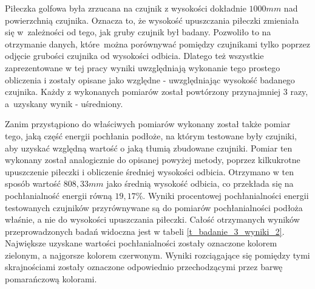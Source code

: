 Piłeczka golfowa była zrzucana na czujnik z wysokości dokładnie $1000 mm$ nad powierzchnią czujnika. Oznacza to, że wysokość upuszczania piłeczki zmieniała się w~zależności od tego, jak gruby czujnik był badany. Pozwoliło to na otrzymanie danych, które~można porównywać pomiędzy czujnikami tylko poprzez odjęcie grubości czujnika od wysokości odbicia. Dlatego też wszystkie zaprezentowane w tej pracy wyniki uwzględniają wykonanie tego prostego obliczenia i zostały opisane jako względne - uwzględniając wysokość badanego czujnika. Każdy z wykonanych pomiarów został powtórzony przynajmniej 3 razy, a~uzyskany wynik - uśredniony.

Zanim przystąpiono do właściwych pomiarów wykonany został także pomiar tego, jaką część energii pochłania podłoże, na którym testowane były czujniki, aby uzyskać względną wartość o jaką tłumią zbudowane czujniki. Pomiar ten wykonany został analogicznie do opisanej powyżej metody, poprzez kilkukrotne upuszczenie piłeczki i obliczenie średniej wysokości odbicia. Otrzymano w ten sposób wartość $808,33 mm$ jako średnią wysokość odbicia, co przekłada się na pochłanialność energii równą $19,17 \%$. Wyniki procentowej pochłanialności energii testowanych czujników przyrównywane są do pomiarów pochłanialności podłoża właśnie, a nie do wysokości upuszczania piłeczki. Całość otrzymanych wyników przeprowadzonych badań widoczna jest w tabeli \ref{t_badanie_3_wyniki_2}. Największe uzyskane wartości pochłanialności zostały oznaczone kolorem zielonym, a najgorsze kolorem czerwonym. Wyniki rozciągające się pomiędzy tymi skrajnościami zostały oznaczone odpowiednio przechodzącymi przez barwę pomarańczową kolorami.

